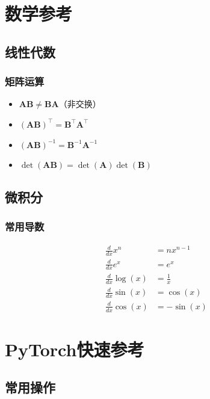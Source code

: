%

\clearpage
\cleardoublepage

\appendix

\chapter{数学参考}

\section{线性代数}

\subsection{矩阵运算}

\begin{itemize}
    \item $\mathbf{AB} \neq \mathbf{BA}$（非交换）
    \item $(\mathbf{AB})^\top = \mathbf{B}^\top\mathbf{A}^\top$
    \item $(\mathbf{AB})^{-1} = \mathbf{B}^{-1}\mathbf{A}^{-1}$
    \item $\det(\mathbf{AB}) = \det(\mathbf{A})\det(\mathbf{B})$
\end{itemize}

\section{微积分}

\subsection{常用导数}

\begin{align}
\frac{d}{dx}x^n &= nx^{n-1} \\
\frac{d}{dx}e^x &= e^x \\
\frac{d}{dx}\log(x) &= \frac{1}{x} \\
\frac{d}{dx}\sin(x) &= \cos(x) \\
\frac{d}{dx}\cos(x) &= -\sin(x)
\end{align}

\chapter{PyTorch快速参考}

\section{常用操作}

